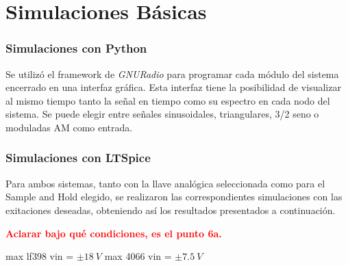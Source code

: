 


\section{Simulaciones Básicas}

\subsubsection{Simulaciones con Python}
Se utilizó el framework de \textit{GNURadio} para programar cada módulo del sistema encerrado en una interfaz gráfica. Esta interfaz tiene la posibilidad de visualizar al mismo tiempo tanto la señal en tiempo como su espectro en cada nodo del sistema. Se puede elegir entre señales sinusoidales, triangulares, 3/2 seno o moduladas AM como entrada.

\subsubsection{Simulaciones con LTSpice}
Para ambos sistemas, tanto con la llave analógica seleccionada como para el Sample and Hold elegido, se realizaron las correspondientes simulaciones con las exitaciones deseadas, obteniendo así los resultados presentados a continuación.

\textcolor{red}{\textbf{Aclarar bajo qué condiciones, es el punto 6a.}}

max lf398 vin = $\pm 18 \ V$
max 4066 vin = $\pm 7.5 \ V$

